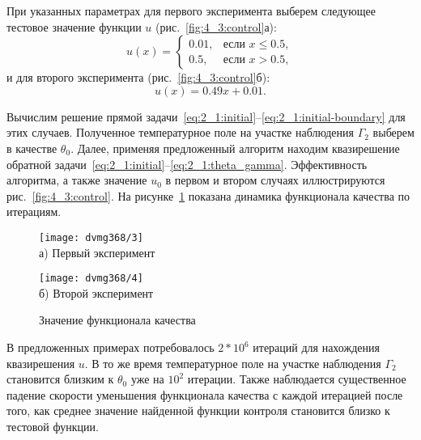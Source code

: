 При указанных параметрах для первого эксперимента выберем следующее тестовое
значение функции $u$ (рис.~\ref{fig:4_3:control}а):
\begin{equation}
    \label{eq:4_3:equation}
    u(x)=
    \begin{cases}
        0.01, & \text{если } x \le 0.5, \\
        0.5, & \text{если } x > 0.5,
    \end{cases}
\end{equation}
и для второго эксперимента (рис.~\ref{fig:4_3:control}б):
\begin{equation}
    \label{eq:4_3:test_function_1}
    u(x)=0.49x+0.01.
\end{equation}

Вычислим решение прямой
задачи~\eqref{eq:2_1:initial}--\eqref{eq:2_1:initial-boundary}
для этих случаев.
Полученное температурное поле на участке наблюдения
$\Gamma_2$ выберем в качестве $\theta_0$.
Далее, применяя предложенный алгоритм находим квазирешение обратной
задачи~\eqref{eq:2_1:initial}--\eqref{eq:2_1:theta_gamma}.
Эффективность алгоритма, а также значение $u_0$ в первом и
втором случаях иллюстрируются рис.~\ref{fig:4_3:control}.
На рисунке~\ref{fig:4_3:cost} показана динамика функционала качества по итерациям.
\begin{figure}[ht]
    \begin{minipage}[b][][b]{0.49\linewidth}
        \centering
        \texttt{[image: dvmg368/3]} \\ а) Первый эксперимент
    \end{minipage}
    \hfill
    \begin{minipage}[b][][b]{0.49\linewidth}
        \centering
        \texttt{[image: dvmg368/4]} \\ б) Второй эксперимент
    \end{minipage}
    \caption{Значение функционала качества}
    \label{fig:4_3:cost}
\end{figure}

\begin{remark}
    В предложенных примерах потребовалось
    $2*10^6$ итераций для нахождения квазирешения $u$.
    В то же время температурное поле на участке наблюдения
    $\Gamma_2$ становится близким к $\theta_0$ уже на $10^2$ итерации.
    Также наблюдается существенное падение скорости уменьшения функционала
    качества с каждой итерацией после того, как среднее значение найденной
    функции контроля становится близко к тестовой функции.
\end{remark}

